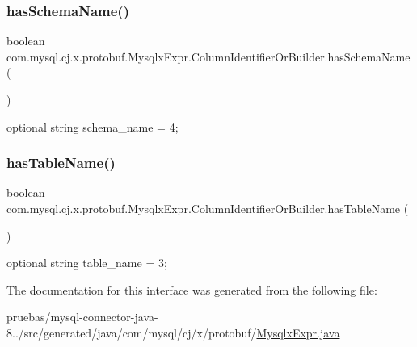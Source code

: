 \subsubsection{\texorpdfstring{has\+Schema\+Name()}{hasSchemaName()}}
{\footnotesize\ttfamily boolean com.\+mysql.\+cj.\+x.\+protobuf.\+Mysqlx\+Expr.\+Column\+Identifier\+Or\+Builder.\+has\+Schema\+Name (\begin{DoxyParamCaption}{ }\end{DoxyParamCaption})}

{\ttfamily optional string schema\+\_\+name = 4;} \mbox{\label{interfacecom_1_1mysql_1_1cj_1_1x_1_1protobuf_1_1_mysqlx_expr_1_1_column_identifier_or_builder_a5b032f4d4832a223b8cba49405d8be69}} 
\subsubsection{\texorpdfstring{has\+Table\+Name()}{hasTableName()}}
{\footnotesize\ttfamily boolean com.\+mysql.\+cj.\+x.\+protobuf.\+Mysqlx\+Expr.\+Column\+Identifier\+Or\+Builder.\+has\+Table\+Name (\begin{DoxyParamCaption}{ }\end{DoxyParamCaption})}

{\ttfamily optional string table\+\_\+name = 3;} 

The documentation for this interface was generated from the following file\+:\begin{DoxyCompactItemize}
\item 
pruebas/mysql-\/connector-\/java-\/8../src/generated/java/com/mysql/cj/x/protobuf/\mbox{\hyperlink{_mysqlx_expr_8java}{Mysqlx\+Expr.\+java}}\end{DoxyCompactItemize}
